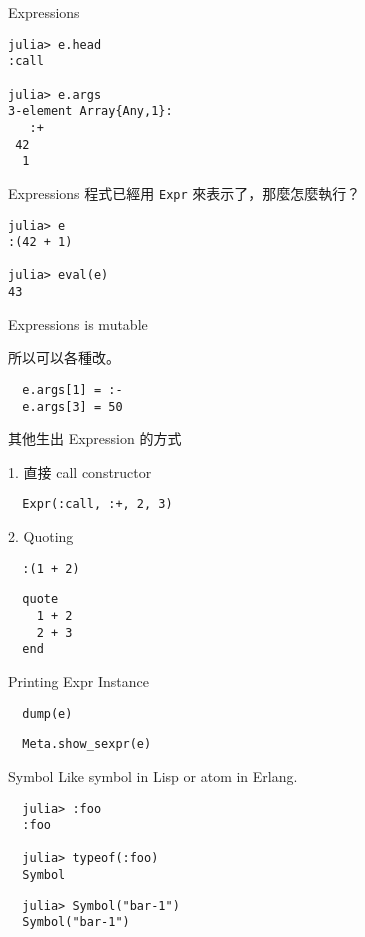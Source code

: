\documentclass[14pt]{beamer}
\begin{document}
\begin{frame}[fragile]{Expressions}
\begin{lstlisting}
julia> e.head
:call

julia> e.args
3-element Array{Any,1}:
   :+
 42
  1
\end{lstlisting}
\end{frame}


\begin{frame}[fragile]{Expressions}
  程式已經用 \texttt{Expr} 來表示了，那麼怎麼執行？

  \pause

\begin{lstlisting}
julia> e
:(42 + 1)

julia> eval(e)
43
\end{lstlisting}
\end{frame}


\begin{frame}[fragile]{Expressions is mutable}

  所以可以各種改。

\begin{lstlisting}
  e.args[1] = :-
  e.args[3] = 50
\end{lstlisting}
\end{frame}


\begin{frame}[fragile]{其他生出 Expression 的方式}

  1. 直接 call constructor

\begin{lstlisting}
  Expr(:call, :+, 2, 3)
\end{lstlisting}

  \pause

  2. Quoting

\begin{lstlisting}
  :(1 + 2)
\end{lstlisting}
\begin{lstlisting}
  quote
    1 + 2
    2 + 3
  end
\end{lstlisting}

\end{frame}


\begin{frame}[fragile]{Printing Expr Instance}
\begin{lstlisting}
  dump(e)
\end{lstlisting}

\begin{lstlisting}
  Meta.show_sexpr(e)
\end{lstlisting}

\end{frame}


\begin{frame}[fragile]{Symbol}
  Like symbol in Lisp or atom in Erlang.

\begin{lstlisting}
  julia> :foo
  :foo

  julia> typeof(:foo)
  Symbol
\end{lstlisting}

  \pause

\begin{lstlisting}
  julia> Symbol("bar-1")
  Symbol("bar-1")
\end{lstlisting}
\end{frame}
\end{document}
